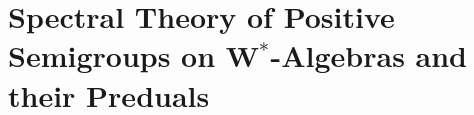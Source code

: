 \setcounter{chapter}{2}
\chapter{Spectral Theory of Positive Semigroups on 
\texorpdfstring{W$^{*}$-Algebras}{W*-Algebras} and their Preduals}\label{chap:d3}

%
%
%
%
%
%

